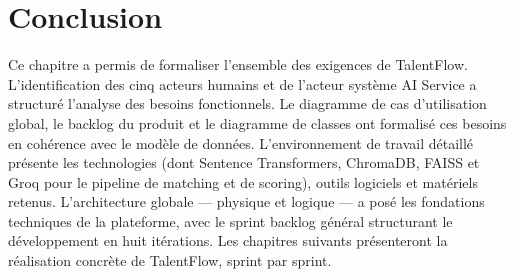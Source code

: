 \section*{Conclusion}

Ce chapitre a permis de formaliser l'ensemble des exigences de TalentFlow. L'identification
des cinq acteurs humains et de l'acteur système AI Service a structuré l'analyse des
besoins fonctionnels. Le diagramme de cas d'utilisation global, le backlog du produit
et le diagramme de classes ont formalisé ces besoins en cohérence avec le modèle de données.
L'environnement de travail détaillé présente les technologies (dont Sentence Transformers,
ChromaDB, FAISS et Groq pour le pipeline de matching et de scoring), outils logiciels
et matériels retenus. L'architecture globale — physique et logique — a posé les fondations techniques
de la plateforme, avec le sprint backlog général structurant le développement en huit
itérations. Les chapitres suivants présenteront la réalisation concrète de TalentFlow,
sprint par sprint.
